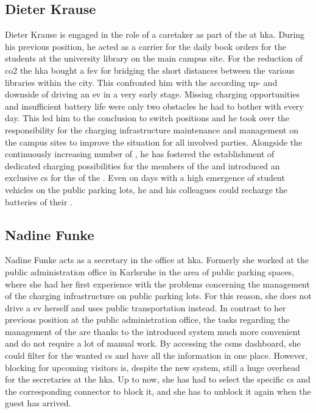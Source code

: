 \subsection{Dieter Krause}
\label{ch:Requirements Engineering:sec:Personas:ssec:Dieter Krause}

Dieter Krause is engaged in the role of a caretaker as part of the  at \acrshort{hka}. During his previous position, he acted as a carrier for the daily book orders for the students at the university library on the main campus site. 
For the reduction of \acrshort{co2} the \acrshort{hka} bought a \acrshort{fev} for bridging the short distances between the various libraries within the city.
This confronted him with the according up- and downside of driving an \acrshort{ev} in a very early stage.
Missing charging opportunities and insufficient battery life were only two obstacles he had to bother with every day. This led him to the conclusion to switch positions and he took over the responsibility for the charging infrastructure maintenance and management on the campus sites to improve the situation for all involved parties.
Alongside the continuously increasing number of , he has fostered the establishment of dedicated charging possibilities for the members of the  and introduced an exclusive \acrshort{cs} for the  of the . 
Even on days with a high emergence of student vehicles on the public parking lots, he and his colleagues could recharge the batteries of their . 

\subsection{Nadine Funke}
\label{ch:Requirements Engineering:sec:Personas:ssec:Nadine Funke}

Nadine Funke acts as a secretary in the  office at \acrshort{hka}. Formerly she worked at the public administration office in Karlsruhe in the area of public parking spaces, where she had her first experience with the problems concerning the management of the charging infrastructure on public parking lots.
For this reason, she does not drive a \acrshort{ev} herself and uses public transportation instead. In contrast to her previous position at the public administration office, the tasks regarding the management of the  are thanks to the introduced system much more convenient and do not require a lot of manual work.
By accessing the \acrshort{csms} dashboard, she could filter for the wanted \acrshort{cs} and have all the information in one place.
However, blocking  for upcoming visitors is, despite the new system, still a huge overhead for the secretaries at the \acrshort{hka}.
Up to now, she has had to select the specific \acrshort{cs} and the corresponding connector to block it, and she has to unblock it again when the guest has arrived.

